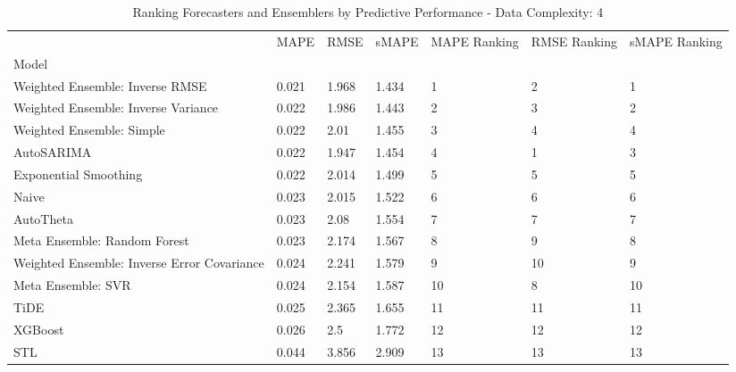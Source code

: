 \begin{table}
\caption{Ranking Forecasters and Ensemblers by Predictive Performance - Data Complexity: 4}
\begin{tabular}{lllllll}
\toprule
 & MAPE & RMSE & sMAPE & MAPE Ranking & RMSE Ranking & sMAPE Ranking \\
Model &  &  &  &  &  &  \\
\midrule
Weighted Ensemble: Inverse RMSE & 0.021 & 1.968 & 1.434 & 1 & 2 & 1 \\
Weighted Ensemble: Inverse Variance & 0.022 & 1.986 & 1.443 & 2 & 3 & 2 \\
Weighted Ensemble: Simple & 0.022 & 2.01 & 1.455 & 3 & 4 & 4 \\
AutoSARIMA & 0.022 & 1.947 & 1.454 & 4 & 1 & 3 \\
Exponential Smoothing & 0.022 & 2.014 & 1.499 & 5 & 5 & 5 \\
Naive & 0.023 & 2.015 & 1.522 & 6 & 6 & 6 \\
AutoTheta & 0.023 & 2.08 & 1.554 & 7 & 7 & 7 \\
Meta Ensemble: Random Forest & 0.023 & 2.174 & 1.567 & 8 & 9 & 8 \\
Weighted Ensemble: Inverse Error Covariance & 0.024 & 2.241 & 1.579 & 9 & 10 & 9 \\
Meta Ensemble: SVR & 0.024 & 2.154 & 1.587 & 10 & 8 & 10 \\
TiDE & 0.025 & 2.365 & 1.655 & 11 & 11 & 11 \\
XGBoost & 0.026 & 2.5 & 1.772 & 12 & 12 & 12 \\
STL & 0.044 & 3.856 & 2.909 & 13 & 13 & 13 \\
\bottomrule
\end{tabular}
\end{table}
